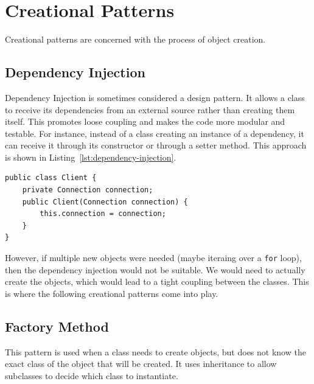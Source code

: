 \section{Creational Patterns}

Creational patterns are concerned with the process of object creation.

\subsection{Dependency Injection}

Dependency Injection is sometimes considered a design pattern. It allows a class to receive its dependencies from an external source rather than creating them itself. This promotes loose coupling and makes the code more modular and testable. For instance, instead of a class creating an instance of a dependency, it can receive it through its constructor or through a setter method. This approach is shown in Listing~\ref{lst:dependency-injection}.
\begin{listing}
    \begin{verbatim}
public class Client {
    private Connection connection;
    public Client(Connection connection) {
        this.connection = connection;
    }
}
    \end{verbatim}
    \caption{Dependency Injection example.}
    \label{lst:dependency-injection}
\end{listing}

However, if multiple new objects were needed (maybe iteraing over a \texttt{for} loop), then the dependency injection would not be suitable. We would need to actually create the objects, which would lead to a tight coupling between the classes. This is where the following creational patterns come into play.

\subsection{Factory Method}

This pattern is used when a class needs to create objects, but does not know the exact class of the object that will be created. It uses inheritance to allow subclasses to decide which class to instantiate.

